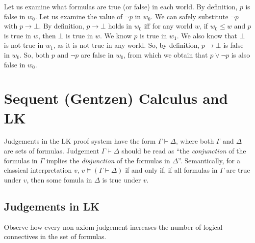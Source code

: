 {{Let us examine what formulas are true (or false) in each world. By
definition, $p$ is false in $w_0$. Let us examine the value of
$\neg p$ in $w_0$. We can safely substitute $\neg p$ with $p
\rightarrow \bot$. By definition, $p \rightarrow \bot$ holds in
$w_0$ iff for any world $w$, if $w_0 \leq w$ and $p$ is true in $w$,
then $\bot$ is true in $w$. We know $p$ is true in $w_1$. We also
know that $\bot$ is not true in $w_1$, as it is not true in any world.
So, by definition, $p \rightarrow \bot$ is false in $w_0$. So, both
$p$ and $\neg p$ are false in $w_0$, from which we obtain that $p
\lor \neg p$ is also false in $w_0$.

\section{Sequent (Gentzen) Calculus and LK}

Judgements in the LK proof system have the form $\Gamma \vdash
\Delta$, where both $\Gamma$ and $\Delta$ are sets of formulas.
Judgement $\Gamma \vdash \Delta$ should be read as ``the
\emph{conjunction} of the formulas in $\Gamma$ implies the
\emph{disjunction} of the formulas in $\Delta$''. Semantically, for
a classical interpretation $v$, $v \models (\Gamma \vdash \Delta)$
if and only if, if all formulas in $\Gamma$ are true under $v$, then
some fomula in $\Delta$ is true under $v$.

\subsection{Judgements in LK}

Observe how every non-axiom judgement increases the number of logical
connectives in the set of formulas.

}}
